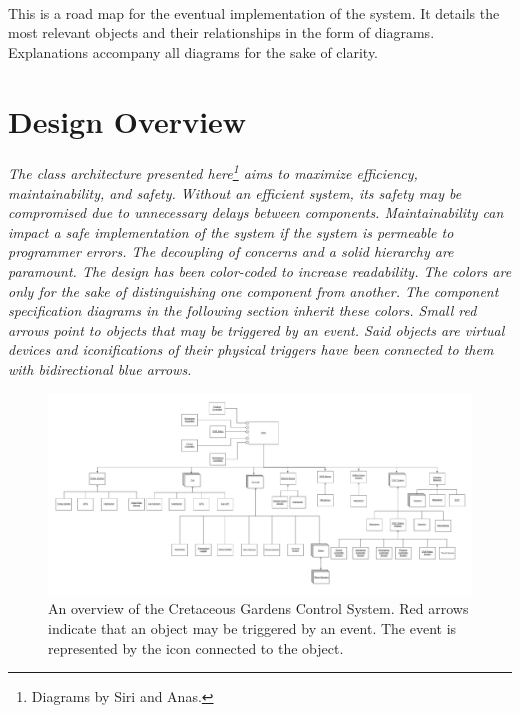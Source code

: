 \documentclass[12pt]{article}
\begin{document}
\paragraph{} This is a road map for the eventual implementation of the system. It details the most relevant objects and their relationships in the form of diagrams. Explanations accompany all diagrams for the sake of clarity.

\section{Design Overview} \label{over}
\paragraph{} \textit{The class architecture presented here\footnote{Diagrams by 
Siri and Anas.} aims to maximize efficiency, maintainability, and 
safety. Without an efficient system, its safety may be compromised due to unnecessary 
delays between components. Maintainability can impact a safe implementation of the 
system if the system is permeable to programmer errors. The decoupling of concerns and 
a solid hierarchy are paramount. The design has been color-coded to increase readability. 
The colors are only for the sake of distinguishing one component from another. The component 
specification diagrams in the following section inherit these colors. Small red arrows point 
to objects that may be triggered by an event. Said objects are virtual devices and iconifications 
of their physical triggers have been connected to them with bidirectional blue arrows.}

\begin{figure}[H]
    \centerline{\includegraphics[scale=.15]{CGCOverview.png}}
    \caption{An overview of the Cretaceous Gardens Control System. Red arrows indicate that an object may be triggered by an event. The
    event is represented by the icon connected to the object.}
    \label{fig:CGCOverview}
\end{figure}    
\end{document}
